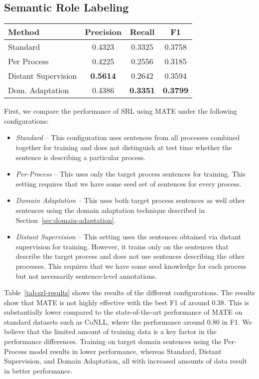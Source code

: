\subsection{Semantic Role Labeling}
\begin{table*}[htdp]
\begin{center}
\begin{tabular}{|l|c|c|c|}
\hline
Method			& 	Precision	&	Recall	&	F1\\
\hline
Standard			& 	0.4323	& 	0.3325	&	0.3758\\
Per Process		&	0.4225	& 	0.2556	& 	0.3185\\
Distant Supervision 	& 	{\bf 0.5614}	& 	0.2642	& 	0.3594 \\
Dom. Adaptation	& 	0.4386	& 	{\bf 0.3351}	& 	{\bf 0.3799}\\
\hline
\end{tabular}
\end{center}
\caption{Semantic Role Labeling Performance. Bold face entries indicate the best performance.}
\label{tab:srl-results}
\end{table*}%

First, we compare the performance of SRL using MATE under the following configurations:
\begin{itemize}
\item {\em Standard} -- This configuration uses sentences from all processes combined together for training and does not distinguish at test time whether the sentence is describing a particular process.
\item {\em Per-Process} -- This uses only the target process sentences for training. This setting requires that we have some seed set of sentences for every process.
\item {\em Domain Adaptation} -- This uses both target process sentences as well other sentences using the domain adaptation technique described in Section~\ref{sec:domain-adaptation}.
\item {\em Distant Supervision} -- This setting uses the sentences obtained via distant supervision for training. 
However, it trains only on the sentences that describe the target process and does not use sentences describing the other processes. 
This requires that we have some seed knowledge for each process but not necessarily sentence-level annotations.
\end{itemize}

Table~\ref{tab:srl-results} shows the results of the different configurations. 
The results show that MATE is not highly effective with the best F1 of around 0.38. 
This is substantially lower compared to the state-of-the-art performance of MATE on standard datasets such as CoNLL, where the performance around 0.80 in F1. 
We believe that the limited amount of training data is a key factor in the performance differences.
Training on target domain sentences using the Per-Process model results in lower performance, whereas Standard, Distant Supervision, and Domain Adaptation, all with increased amounts of data result in better performance. 

